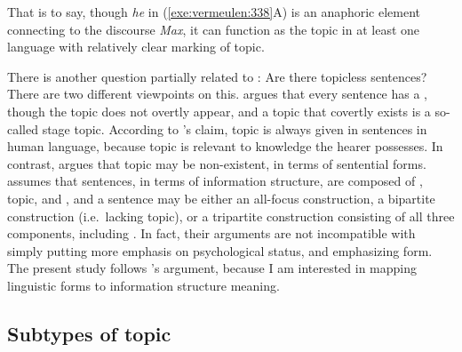 

\noindent That is to say, though \textit{he}
in (\ref{exe:vermeulen:338}A) is an anaphoric element connecting to the
discourse  \textit{Max}, it can function as the topic in at least
one language with relatively clear marking of topic.  



There is another question partially related to : Are
there topicless sentences?  There are two different viewpoints on
this.  \citet{erteschik:07} argues that every sentence has a ,
though the topic does not overtly appear, and a topic that covertly
exists is a so-called stage topic.  According to
\citeauthor{erteschik:07}'s claim, topic is always given in sentences
in human language, because topic is relevant to knowledge the hearer
possesses. In contrast, \citet{buring:99} argues that topic may be
non-existent, in terms of sentential forms. \citeauthor{buring:99}
assumes that sentences, in terms of information structure, are
composed of , topic, and , and a sentence may be
either an all-focus construction, a bipartite construction
(i.e.\ lacking topic), or a tripartite construction consisting of all
three components, including .  In fact, their
arguments are not incompatible with \citeauthor{erteschik:07} simply
putting more emphasis on psychological status, and
\citeauthor{buring:99} emphasizing form. The present study follows
\citeauthor{buring:99}'s argument, because I am interested in mapping
linguistic forms to information structure meaning.





\subsection{Subtypes of topic}
\label{3:ssec:subtypes-topic}


